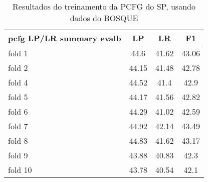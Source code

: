 \begin{table}[!h]
    \centering
    \begin{tabular}{|l|c|c|c|}
        \hline
        pcfg LP/LR summary evalb    &   LP  & LR    &   F1\\
        \hline
        fold 1   &   44.6    &   41.62   &   43.06\\
        fold 2   &   44.15   &   41.48   &   42.78\\
        fold 4   &   44.52   &   41.4   &   42.9\\
        fold 5   &   44.17   &   41.56   &   42.82\\
        fold 6   &   44.29   &   41.02   &   42.59\\
        fold 7   &   44.92   &   42.14   &   43.49\\
        fold 8   &   44.83   &   41.62   &   43.17\\
        fold 9   &   43.88   &   40.83   &   42.3\\
        fold 10   &   43.78   &   40.54   &   42.1\\
        \hline
    \end{tabular}
    \caption{Resultados do treinamento da PCFG do SP, usando dados do BOSQUE}
    \label{tab:result_bosque_pcfg}
\end{table}